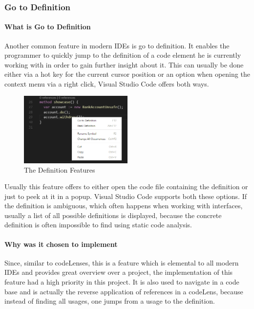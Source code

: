 \subsubsection{Go to Definition} \label{aggotodefinition}
\paragraph{What is Go to Definition}
Another common feature in modern IDEs is go to definition. It enables the programmer to quickly jump to the definition of a code element he is currently working with in order to gain further insight about it. This can usually be done either via a hot key for the current cursor position or an option when opening the context menu via a right click, Visual Studio Code offers both ways.\newline

\begin{figure}[H]
	\centering
	\includegraphics[width=0.5\textwidth]{img/goToDefinition}
	\caption{The Definition Features}
	\label{fig:aggotodefinition}
\end{figure}

Usually this feature offers to either open the code file containing the definition or just to peek at it in a popup. Visual Studio Code supports both these options. If the definition is ambiguous, which often happens when working with interfaces, usually a list of all possible definitions is displayed, because the concrete definition is often impossible to find using static code analysis.

\paragraph{Why was it chosen to implement}
Since, similar to codeLenses, this is a feature which is elemental to all modern IDEs and provides great overview over a project, the implementation of this feature had a high priority in this project. It is also used to navigate in a code base and is actually the reverse application of references in a codeLens, because instead of finding all usages, one jumps from a usage to the definition. \newline

